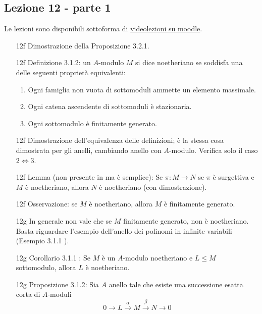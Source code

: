 \documentclass[italian]{article}
\begin{document}
    \subsection{Lezione 12 - parte 1}

	Le lezioni sono disponibili sottoforma di 
	\href{https://didatticaonline.unitn.it/dol/course/view.php?id=23268}{videolezioni
		su moodle}.
	
	\begin{enumerate}
      \item[12f] Dimostrazione della Proposizione 3.2.1. 
      \item[12f] Definizione 3.1.2\cite{vergura}: un $A$-modulo $M$ si dice 
        noetheriano se soddisfa una delle seguenti proprietà equivalenti:
        \begin{enumerate}
          \item Ogni famiglia non vuota di sottomoduli ammette un elemento
            massimale.
          \item Ogni catena ascendente di sottomoduli è stazionaria.
          \item Ogni sottomodulo è finitamente generato.
        \end{enumerate}
      \item[12f] Dimostrazione dell'equivalenza delle definizioni; è la stessa
        cosa dimostrata per gli anelli, cambiando anello con $A$-modulo.
        Verifica solo il caso $2 \iff 3$. 
      \item[12f] Lemma (non presente in \cite{vergura} ma è semplice): Se $\pi \colon 
      	M \to N$ se $\pi$ è surgettiva e $M$ è noetheriano, allora $N$ è noetheriano 
        (con dimostrazione).
      \item[12f] Osservazione: se $M$ è noetheriano, allora $M$ è finitamente
        generato.
      \item[12g] In generale non vale che se $M$ finitamente generato, non
        è noetheriano. Basta riguardare l'esempio dell'anello dei polinomi in
        infinite variabili (Esempio 3.1.1 \cite{vergura}).
      \item[12g] Corollario 3.1.1 \cite{vergura}: Se $M$ è un $A$-modulo noetheriano 
        e $L \le M$ sottomodulo, allora $L$ è noetheriano.
      \item[12g] Proposizione 3.1.2\cite{vergura}: Sia $A$ anello tale che 
        esiste una successione esatta corta di $A$-moduli
        \begin{equation*}
          0 \to L \xrightarrow{\alpha} M \xrightarrow{\beta}
            N \to 0

\end{equation*}
\end{enumerate}
\end{document}

